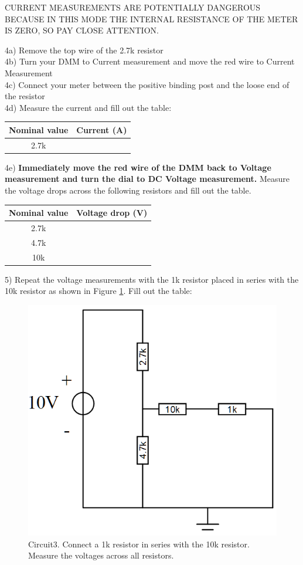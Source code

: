 \documentclass[11pt,letterpaper]{article}
\begin{document}
\begin{center}
CURRENT MEASUREMENTS ARE POTENTIALLY DANGEROUS BECAUSE IN THIS MODE THE INTERNAL RESISTANCE OF THE METER IS ZERO, SO PAY CLOSE ATTENTION.\\
\end{center}

4a) Remove the top wire of the 2.7k resistor\\
4b) Turn your DMM to Current measurement and move the red wire to Current Measurement\\
4c) Connect your meter between the positive binding post and the loose end of the resistor\\
4d) Measure the current and fill out the table:\\

\begin{center}
\begin{tabular}{|c|c|}
\hline Nominal value & Current (A)\\ 
\hline 2.7k &  \\ 
\hline 
\end{tabular} 
\end{center}


4e) \textbf{Immediately move the red wire of the DMM back to Voltage measurement and turn the dial to DC Voltage measurement.} Measure the voltage drops across the following resistors and fill out the table.\\

\begin{center}
\begin{tabular}{|c|c|}
\hline Nominal value & Voltage drop (V)\\ 
\hline 2.7k &  \\ 
\hline 4.7k &  \\ 
\hline 10k &  \\ 
\hline 
\end{tabular} 
\end{center}

5) Repeat the voltage measurements with the 1k resistor placed in series with the 10k resistor as shown in Figure \ref{fig:Lab1_Circuit3}. Fill out the table:\\

\begin{figure}
\centering
\includegraphics[width=0.6\linewidth]{Lab1_Circuit3}
\caption{Circuit3. Connect a 1k resistor in series with the 10k resistor. Measure the voltages across all resistors.}
\label{fig:Lab1_Circuit3}
\end{figure}
\end{document}
